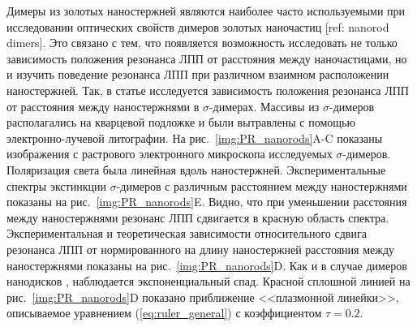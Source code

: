 Димеры из золотых наностержней являются наиболее часто используемыми при исследовании оптических свойств димеров золотых наночастиц [ref: nanorod dimers]. Это связано с тем, что появляется возможность исследовать не только зависимость положения резонанса ЛПП от расстояния между наночастицами, но и изучить поведение резонанса ЛПП при различном взаимном расположении наностержней. Так, в статье \cite{nanorods2} исследуется зависимость положения резонанса ЛПП от расстояния между наностержнями в $ \sigma $-димерах. Массивы из $ \sigma $-димеров располагались на кварцевой подложке и были вытравлены с помощью электронно-лучевой литографии. На рис.~\ref{img:PR_nanorods}A-C показаны изображения с растрового электронного микроскопа исследуемых $ \sigma $-димеров. Поляризация света была линейная вдоль наностержней. Экспериментальные спектры экстинкции $ \sigma $-димеров с различным расстоянием между наностержнями показаны на рис.~\ref{img:PR_nanorods}E. Видно, что при уменьшении расстояния между наностержнями резонанс ЛПП сдвигается в красную область спектра. Экспериментальная и теоретическая зависимости относительного сдвига резонанса ЛПП от нормированного на длину наностержней расстояния между наностержнями показаны на рис.~\ref{img:PR_nanorods}D. Как и в случае димеров нанодисков \cite{plasonrulereq}, наблюдается экспоненциальный спад. Красной сплошной линией на рис.~\ref{img:PR_nanorods}D показано приближение <<плазмонной линейки>>, описываемое уравнением (\ref{eq:ruler_general})  с коэффициентом $ \tau = 0.2 $.

